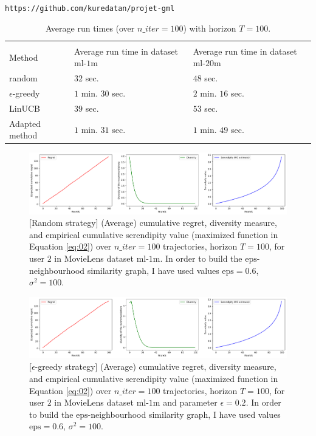 \documentclass{article}
\begin{document}
\begin{center} \texttt{https://github.com/kuredatan/projet-gml} \end{center}

\begin{table}[H]
  \label{runtimes}
  \centering
  \begin{tabular}{lll}
    \multicolumn{3}{c}{}                   \\
    \cmidrule(r){1-3}
    Method     & Average run time in dataset $\text{ml-1m}$ &  Average run time in dataset $\text{ml-20m}$  \\
    \midrule
    random & $32$ sec. & $48$ sec.  \\
    $\epsilon$-greedy & $1$ min. $30$ sec. & $2$ min. $16$ sec.\\
    LinUCB     & $39$ sec. & $53$ sec.\\
    Adapted method     & $1$ min. $31$ sec. & $1$ min. $49$ sec. \\
    \bottomrule
  \end{tabular}
  \caption{Average run times (over $n\_iter=100$) with horizon $T=100$.}
\end{table}

\begin{figure}[H]
  \centering
  \includegraphics[scale=0.4]{../Results/ml-1m/random-32sec.png}
  \caption{[Random strategy] (Average) cumulative regret, diversity measure, and empirical cumulative serendipity value (maximized function in Equation \ref{eq:02}) over $n\_iter=100$ trajectories, horizon $T=100$, for user $2$ in MovieLens dataset $\text{ml-1m}$. In order to build the $\text{eps}$-neighbourhood similarity graph, I have used values $\text{eps}=0.6$, $\sigma^{2}=100$.}
\label{figrandom}
\end{figure}

\begin{figure}[H]
  \centering
  \includegraphics[scale=0.4]{../Results/ml-1m/greedy-1min30sec.png}
  \caption{[$\epsilon$-greedy strategy] (Average) cumulative regret, diversity measure, and empirical cumulative serendipity value (maximized function in Equation \ref{eq:02}) over $n\_iter=100$ trajectories, horizon $T=100$, for user $2$ in MovieLens dataset $\text{ml-1m}$ and parameter $\epsilon=0.2$. In order to build the $\text{eps}$-neighbourhood similarity graph, I have used values $\text{eps}=0.6$, $\sigma^{2}=100$.}
\label{figgreedy}
\end{figure}
\end{document}
